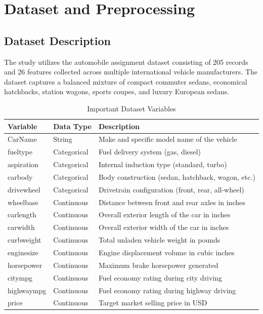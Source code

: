 \documentclass[conference]{IEEEtran}
\begin{document}
\section{Dataset and Preprocessing}

\subsection{Dataset Description}
The study utilizes the automobile assignment dataset consisting of 205 records and 26 features collected across multiple international vehicle manufacturers. The dataset captures a balanced mixture of compact commuter sedans, economical hatchbacks, station wagons, sports coupes, and luxury European sedans.

\begin{table}[htbp]
\caption{Important Dataset Variables}
\begin{center}
\begin{tabular}{lll}
\toprule
\textbf{Variable} & \textbf{Data Type} & \textbf{Description} \\
\midrule
CarName & String & Make and specific model name of the vehicle \\
fueltype & Categorical & Fuel delivery system (gas, diesel) \\
aspiration & Categorical & Internal induction type (standard, turbo) \\
carbody & Categorical & Body construction (sedan, hatchback, wagon, etc.) \\
drivewheel & Categorical & Drivetrain configuration (front, rear, all-wheel) \\
wheelbase & Continuous & Distance between front and rear axles in inches \\
carlength & Continuous & Overall exterior length of the car in inches \\
carwidth & Continuous & Overall exterior width of the car in inches \\
curbweight & Continuous & Total unladen vehicle weight in pounds \\
enginesize & Continuous & Engine displacement volume in cubic inches \\
horsepower & Continuous & Maximum brake horsepower generated \\
citympg & Continuous & Fuel economy rating during city driving \\
highwaympg & Continuous & Fuel economy rating during highway driving \\
price & Continuous & Target market selling price in USD \\
\bottomrule
\end{tabular}
\label{tab:variables}
\end{center}
\end{table}
\end{document}
